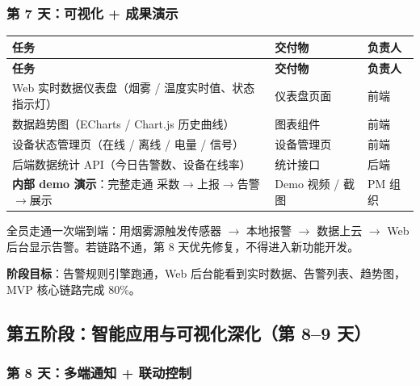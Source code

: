 \documentclass[UTF8,12pt,a4paper]{ctexart}
\begin{document}
\subsubsection{第 7 天：可视化 + 成果演示}

\begin{longtable}{L{6cm}L{4.5cm}C{2.5cm}}
\toprule
\textbf{任务} & \textbf{交付物} & \textbf{负责人} \\
\midrule
\endfirsthead
\toprule
\textbf{任务} & \textbf{交付物} & \textbf{负责人} \\
\midrule
\endhead
\bottomrule
\endfoot

Web 实时数据仪表盘（烟雾 / 温度实时值、状态指示灯） & 仪表盘页面 & 前端 \\
\midrule
数据趋势图（ECharts / Chart.js 历史曲线） & 图表组件 & 前端 \\
\midrule
设备状态管理页（在线 / 离线 / 电量 / 信号） & 设备管理页 & 前端 \\
\midrule
后端数据统计 API（今日告警数、设备在线率） & 统计接口 & 后端 \\
\midrule
\textbf{内部 demo 演示}：完整走通 采数$\rightarrow$上报$\rightarrow$告警$\rightarrow$展示 & Demo 视频 / 截图 & PM 组织 \\
\bottomrule
\end{longtable}

\begin{tcolorbox}[colback=lightblue,colframe=mainblue,arc=2mm,boxrule=0.8pt,title={\faCheckCircle\ 检查点 D7 晚}]
全员走通一次端到端：用烟雾源触发传感器 $\rightarrow$ 本地报警 $\rightarrow$ 数据上云 $\rightarrow$ Web 后台显示告警。若链路不通，第 8 天优先修复，不得进入新功能开发。
\end{tcolorbox}

\textbf{阶段目标}：告警规则引擎跑通，Web 后台能看到实时数据、告警列表、趋势图，MVP 核心链路完成 80\%。

\subsection{第五阶段：智能应用与可视化深化（第 8--9 天）}

\subsubsection{第 8 天：多端通知 + 联动控制}
\end{document}
